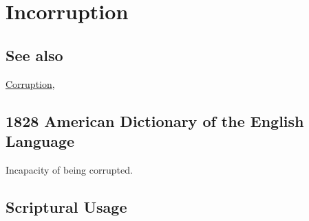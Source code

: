 \section{Incorruption}
	\label{INCORRUPTION}
	
\subsection{See also}

	\hyperref[CORRUPTION]{Corruption},

\subsection{1828 American Dictionary of the English Language} %
	\label{INCORRUPTION-1828}

	\begin{compactitem}
		\item Incapacity of being corrupted.
	\end{compactitem}



\subsection{Scriptural Usage} %
	\label{INCORRUPTION-SCRIPTURES}

	
	
